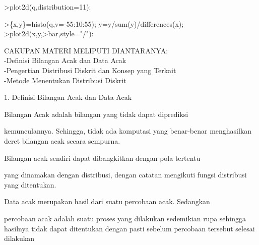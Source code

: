 \documentclass[a4paper,10pt]{article}
\begin{document}
\begin{eulernotebook}
\begin{eulercomment}
\begin{eulercomment}
\begin{eulercomment}
\begin{eulercomment}
\begin{euleroutput}
  [613,  814,  1088,  1404,  1904,  2389,  1431,  1109,  841,  680]
\end{euleroutput}
\begin{eulerprompt}
>plot2d(q,distribution=11):
\end{eulerprompt}
\begin{eulerprompt}
>\{x,y\}=histo(q,v=-55:10:55); y=y/sum(y)/differences(x);
>plot2d(x,y,>bar,style="/"):
\end{eulerprompt}
\begin{eulercomment}
\begin{eulercomment}
\begin{eulercomment}
CAKUPAN MATERI MELIPUTI DIANTARANYA:\\
-Definisi Bilangan Acak dan Data Acak\\
-Pengertian Distribusi Diskrit dan Konsep yang Terkait\\
-Metode Menentukan Distribusi Diskrit


1. Definisi Bilangan Acak dan Data Acak

\end{eulercomment}
\begin{eulerttcomment}
      Bilangan Acak adalah bilangan yang tidak dapat diprediksi
\end{eulerttcomment}
\begin{eulercomment}
kemunculannya. Sehingga, tidak ada komputasi yang benar-benar
menghasilkan deret bilangan acak secara sempurna.\\
\end{eulercomment}
\begin{eulerttcomment}
      Bilangan acak sendiri dapat dibangkitkan dengan pola tertentu
\end{eulerttcomment}
\begin{eulercomment}
yang dinamakan dengan distribusi, dengan catatan mengikuti fungsi
distribusi yang ditentukan.\\
\end{eulercomment}
\begin{eulerttcomment}
      Data acak merupakan hasil dari suatu percobaan acak. Sedangkan
\end{eulerttcomment}
\begin{eulercomment}
percobaan acak adalah suatu proses yang dilakukan sedemikian rupa
sehingga hasilnya tidak dapat ditentukan dengan pasti sebelum
percobaan tersebut selesai dilakukan


\end{eulercomment}
\end{eulercomment}
\end{eulercomment}
\end{eulercomment}
\end{eulercomment}
\end{eulercomment}
\end{eulercomment}
\end{eulernotebook}
\end{document}
